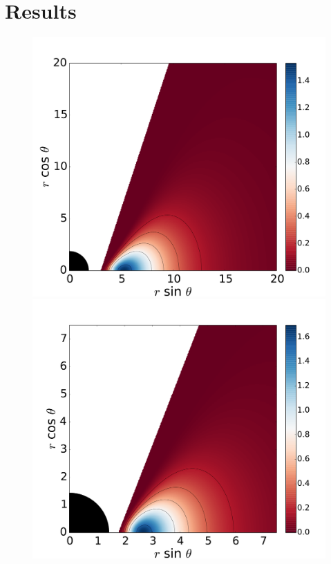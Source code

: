 \documentclass{aa}
\begin{document}
\section{Results}
\label{results}

\begin{figure}
\centering
\includegraphics[scale=0.16]{figures/fig2_1_1.pdf}
\hspace{-0.3cm}
\includegraphics[scale=0.16]{figures/fig2_1_2.pdf}

\end{figure}
\end{document}
